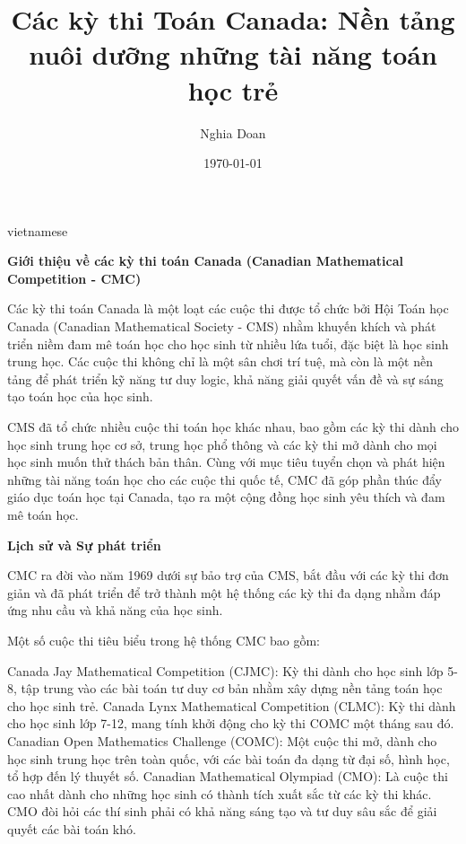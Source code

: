 \documentclass{article}
\title{Các kỳ thi Toán Canada: Nền tảng nuôi dưỡng những tài năng toán học trẻ}
\author{Nghia Doan}
\date{\today}
\begin{document}
\begin{otherlanguage*}{vietnamese}

\maketitle

\textbf{Giới thiệu về các kỳ thi toán Canada (Canadian Mathematical Competition - CMC)}

Các kỳ thi toán Canada là một loạt các cuộc thi được tổ chức bởi Hội Toán học Canada (Canadian Mathematical Society - CMS)
nhằm khuyến khích và phát triển niềm đam mê toán học cho học sinh từ nhiều lứa tuổi, đặc biệt là học sinh trung học.
Các cuộc thi không chỉ là một sân chơi trí tuệ, mà còn là một nền tảng để phát triển kỹ năng tư duy logic,
khả năng giải quyết vấn đề và sự sáng tạo toán học của học sinh.

CMS đã tổ chức nhiều cuộc thi toán học khác nhau, bao gồm các kỳ thi dành cho học sinh trung học cơ sở, trung học phổ thông và các kỳ thi mở dành cho mọi học sinh muốn thử thách bản thân.
Cùng với mục tiêu tuyển chọn và phát hiện những tài năng toán học cho các cuộc thi quốc tế,
CMC đã góp phần thúc đẩy giáo dục toán học tại Canada, tạo ra một cộng đồng học sinh yêu thích và đam mê toán học.

\bigbreak
\textbf{Lịch sử và Sự phát triển}

CMC ra đời vào năm 1969 dưới sự bảo trợ của CMS, bắt đầu với các kỳ thi đơn giản và đã phát triển để trở thành một hệ thống các kỳ thi đa dạng nhằm đáp ứng nhu cầu và khả năng của học sinh.

\bigbreak
Một số cuộc thi tiêu biểu trong hệ thống CMC bao gồm:
\begin{enumerate}[topsep=0pt, partopsep=0pt, itemsep=0pt]
    \ii Canada Jay Mathematical Competition (CJMC): Kỳ thi dành cho học sinh lớp 5-8, tập trung vào các bài toán tư duy cơ bản nhằm xây dựng nền tảng toán học cho học sinh trẻ.
    \ii Canada Lynx Mathematical Competition (CLMC): Kỳ thi dành cho học sinh lớp 7-12, mang tính khởi động cho kỳ thi COMC một tháng sau đó.
    \ii Canadian Open Mathematics Challenge (COMC): Một cuộc thi mở, dành cho học sinh trung học trên toàn quốc, với các bài toán đa dạng từ đại số, hình học, tổ hợp đến lý thuyết số.
    \ii Canadian Mathematical Olympiad (CMO): Là cuộc thi cao nhất dành cho những học sinh có thành tích xuất sắc từ các kỳ thi khác. CMO đòi hỏi các thí sinh phải có khả năng sáng tạo và tư duy sâu sắc để giải quyết các bài toán khó.
\end{enumerate}


\end{otherlanguage*}
\end{document}
